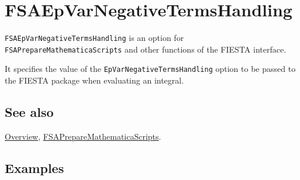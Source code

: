 \documentclass[../FeynHelpersManual.tex]{subfiles}
\begin{document}
\begin{Shaded}
\begin{Highlighting}[]
 
\end{Highlighting}
\end{Shaded}

\hypertarget{fsaepvarnegativetermshandling}{
\section{FSAEpVarNegativeTermsHandling}\label{fsaepvarnegativetermshandling}}

\texttt{FSAEpVarNegativeTermsHandling} is an option for
\texttt{FSAPrepareMathematicaScripts} and other functions of the FIESTA
interface.

It specifies the value of the \texttt{EpVarNegativeTermsHandling} option
to be passed to the FIESTA package when evaluating an integral.

\subsection{See also}

\hyperlink{toc}{Overview},
\hyperlink{fsapreparemathematicascripts}{FSAPrepareMathematicaScripts}.

\subsection{Examples}
\end{document}
